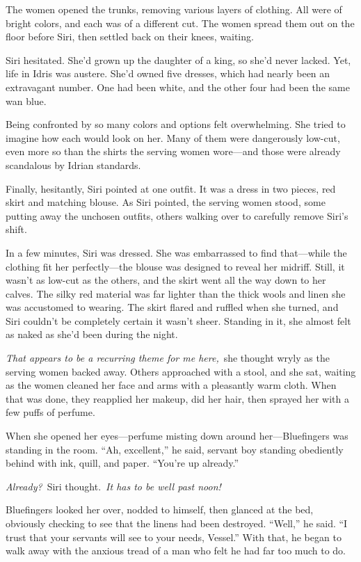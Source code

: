 The women opened the trunks, removing various layers of clothing. All were of bright colors, and each was of a different cut. The women spread them out on the floor before Siri, then settled back on their knees, waiting.

Siri hesitated. She’d grown up the daughter of a king, so she’d never lacked. Yet, life in Idris was austere. She’d owned five dresses, which had nearly been an extravagant number. One had been white, and the other four had been the same wan blue.

Being confronted by so many colors and options felt overwhelming. She tried to imagine how each would look on her. Many of them were dangerously low-cut, even more so than the shirts the serving women wore—and those were already scandalous by Idrian standards.

Finally, hesitantly, Siri pointed at one outfit. It was a dress in two pieces, red skirt and matching blouse. As Siri pointed, the serving women stood, some putting away the unchosen outfits, others walking over to carefully remove Siri’s shift.

In a few minutes, Siri was dressed. She was embarrassed to find that—while the clothing fit her perfectly—the blouse was designed to reveal her midriff. Still, it wasn’t as low-cut as the others, and the skirt went all the way down to her calves. The silky red material was far lighter than the thick wools and linen she was accustomed to wearing. The skirt flared and ruffled when she turned, and Siri couldn’t be completely certain it wasn’t sheer. Standing in it, she almost felt as naked as she’d been during the night.

\textit{That appears to be a recurring theme for me here,}~she thought wryly as the serving women backed away. Others approached with a stool, and she sat, waiting as the women cleaned her face and arms with a pleasantly warm cloth. When that was done, they reapplied her makeup, did her hair, then sprayed her with a few puffs of perfume.

When she opened her eyes—perfume misting down around her—Bluefingers was standing in the room. “Ah, excellent,” he said, servant boy standing obediently behind with ink, quill, and paper. “You’re up already.”

\textit{Already?}~Siri thought.~\textit{It has to be well past noon!}

Bluefingers looked her over, nodded to himself, then glanced at the bed, obviously checking to see that the linens had been destroyed. “Well,” he said. “I trust that your servants will see to your needs, Vessel.” With that, he began to walk away with the anxious tread of a man who felt he had far too much to do.

